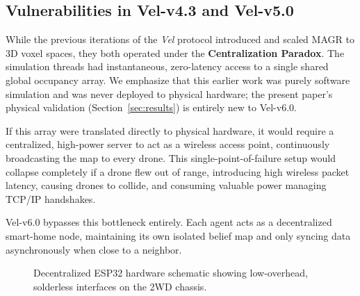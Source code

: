 \documentclass[journal,twoside]{IEEEtran}
\begin{document}
\subsection{Vulnerabilities in Vel-v4.3 and Vel-v5.0}
While the previous iterations of the \textit{Vel} protocol introduced and scaled MAGR to 3D voxel spaces, they both operated under the \textbf{Centralization Paradox}. The simulation threads had instantaneous, zero-latency access to a single shared global occupancy array. We emphasize that this earlier work was purely software simulation and was never deployed to physical hardware; the present paper's physical validation (Section~\ref{sec:results}) is entirely new to Vel-v6.0.

If this array were translated directly to physical hardware, it would require a centralized, high-power server to act as a wireless access point, continuously broadcasting the map to every drone. This single-point-of-failure setup would collapse completely if a drone flew out of range, introducing high wireless packet latency, causing drones to collide, and consuming valuable power managing TCP/IP handshakes.

Vel-v6.0 bypasses this bottleneck entirely. Each agent acts as a decentralized smart-home node, maintaining its own isolated belief map and only syncing data asynchronously when close to a neighbor.

\begin{figure}[htbp]
\centering
{}
\caption{Decentralized ESP32 hardware schematic showing low-overhead, solderless interfaces on the 2WD chassis.}
\label{fig:hardware_platform}
\end{figure}
\end{document}

